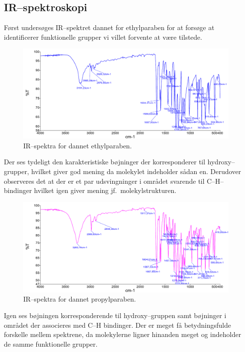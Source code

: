     \subsection{IR--spektroskopi}
    Først undersøges IR--spektret dannet for ethylparaben for at forsøge at identificerer funktionelle grupper vi villet forvente at være tilstede.
    \begin{figure}[H]
        \includegraphics[width=\linewidth]{bilag/ethylir}
        \caption{IR--spektra for dannet ethylparaben.}
    \end{figure}
    Der ses tydeligt den karakteristiske bøjninger der korresponderer til hydroxy--grupper, hvilket giver god mening da molekylet indeholder sådan en. Derudover observeres det at der er et par udsvingninger i området svarende til C--H--bindinger hvilket igen giver mening jf.\ molekylstrukturen.
    \begin{figure}[H]
        \includegraphics[width=\linewidth]{bilag/propylir}
        \caption{IR--spektra for dannet propylparaben.}
    \end{figure}
    Igen ses bøjningen korresponderende til hydroxy--gruppen samt bøjninger i området der associeres med C--H bindinger. Der er meget få betydningsfulde forskelle mellem spektrene, da molekylerne ligner hinanden meget og indeholder de samme funktionelle grupper.

